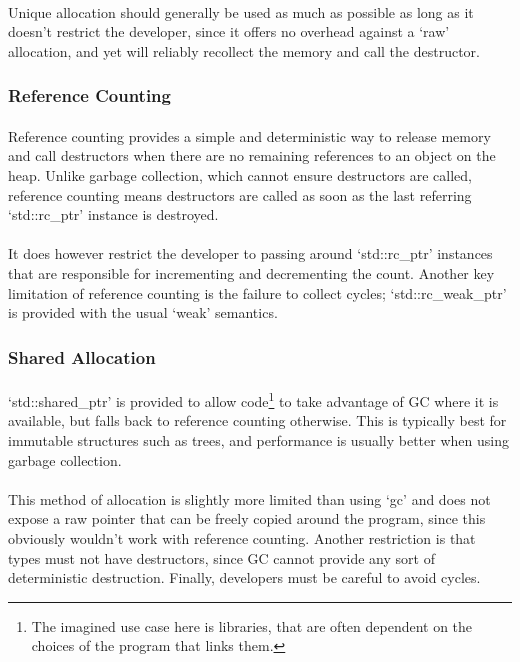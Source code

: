 \documentclass[12pt,twoside,notitlepage]{report}
\begin{document}
\paragraph{}
Unique allocation should generally be used as much as possible as long as it doesn't restrict the developer, since it offers no overhead against a `raw' allocation, and yet will reliably recollect the memory and call the destructor.

\subsubsection{Reference Counting}

\paragraph{}
Reference counting provides a simple and deterministic way to release memory and call destructors when there are no remaining references to an object on the heap. Unlike garbage collection, which cannot ensure destructors are called, reference counting means destructors are called as soon as the last referring `std::rc\_ptr' instance is destroyed.

\paragraph{}
It does however restrict the developer to passing around `std::rc\_ptr' instances that are responsible for incrementing and decrementing the count. Another key limitation of reference counting is the failure to collect cycles; `std::rc\_weak\_ptr' is provided with the usual `weak' semantics.

\subsubsection{Shared Allocation}

\paragraph{}
`std::shared\_ptr' is provided to allow code\footnote{The imagined use case here is libraries, that are often dependent on the choices of the program that links them.} to take advantage of GC where it is available, but falls back to reference counting otherwise. This is typically best for immutable structures such as trees, and performance is usually better when using garbage collection.

\paragraph{}
This method of allocation is slightly more limited than using `gc' and does not expose a raw pointer that can be freely copied around the program, since this obviously wouldn't work with reference counting. Another restriction is that types must not have destructors, since GC cannot provide any sort of deterministic destruction. Finally, developers must be careful to avoid cycles.
\end{document}
